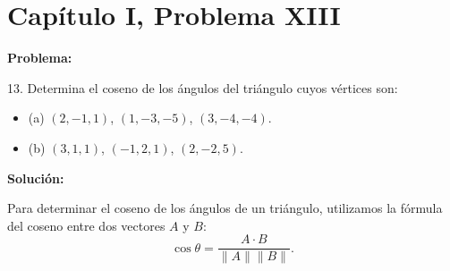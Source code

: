 \section*{Capítulo I, Problema XIII}

\textbf{Problema:}

13. Determina el coseno de los ángulos del triángulo cuyos vértices son:
\begin{itemize}
    \item (a) $(2, -1, 1)$, $(1, -3, -5)$, $(3, -4, -4)$.
    \item (b) $(3, 1, 1)$, $(-1, 2, 1)$, $(2, -2, 5)$.
\end{itemize}

\textbf{Solución:}

Para determinar el coseno de los ángulos de un triángulo, utilizamos la fórmula del coseno entre dos vectores $A$ y $B$:
\[
    \cos \theta = \frac{A \cdot B}{\|A\| \|B\|}.
\]

